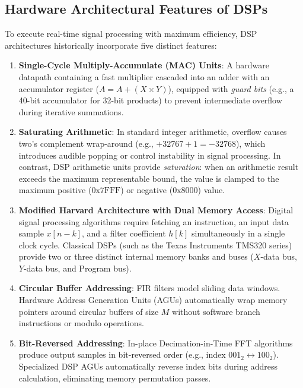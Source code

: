 \subsection{Hardware Architectural Features of DSPs}
To execute real-time signal processing with maximum efficiency, DSP architectures historically incorporate five distinct features:
\begin{enumerate}
    \item \textbf{Single-Cycle Multiply-Accumulate (MAC) Units}: A hardware datapath containing a fast multiplier cascaded into an adder with an accumulator register ($A = A + (X \times Y)$), equipped with \emph{guard bits} (e.g., a 40-bit accumulator for 32-bit products) to prevent intermediate overflow during iterative summations.
    
    \item \textbf{Saturating Arithmetic}: In standard integer arithmetic, overflow causes two's complement wrap-around (e.g., $+32767 + 1 = -32768$), which introduces audible popping or control instability in signal processing. In contrast, DSP arithmetic units provide \textit{saturation}: when an arithmetic result exceeds the maximum representable bound, the value is clamped to the maximum positive ($0\text{x}7\text{FFF}$) or negative ($0\text{x}8000$) value.
    
    \item \textbf{Modified Harvard Architecture with Dual Memory Access}: Digital signal processing algorithms require fetching an instruction, an input data sample $x[n-k]$, and a filter coefficient $h[k]$ simultaneously in a single clock cycle. Classical DSPs (such as the Texas Instruments TMS320 series) provide two or three distinct internal memory banks and buses ($X$-data bus, $Y$-data bus, and Program bus).
    
    \item \textbf{Circular Buffer Addressing}: FIR filters model sliding data windows. Hardware Address Generation Units (AGUs) automatically wrap memory pointers around circular buffers of size $M$ without software branch instructions or modulo operations.
    \item \textbf{Bit-Reversed Addressing}: In-place Decimation-in-Time FFT algorithms produce output samples in bit-reversed order (e.g., index $001_2 \leftrightarrow 100_2$). Specialized DSP AGUs automatically reverse index bits during address calculation, eliminating memory permutation passes.
\end{enumerate}

